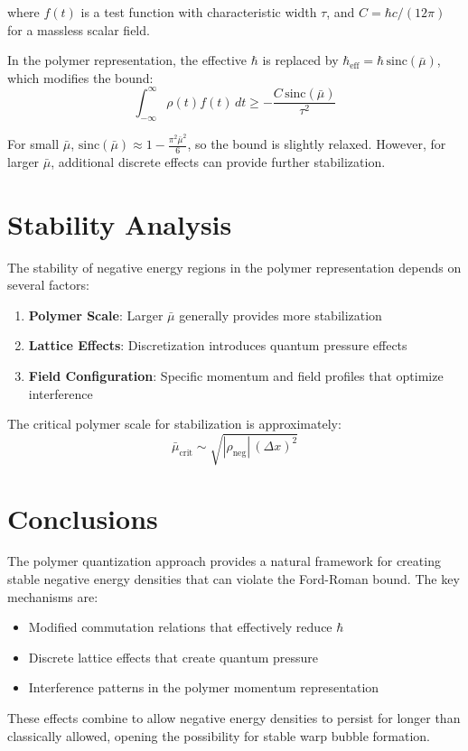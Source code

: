 \documentclass[12pt]{article}
\begin{document}
where $f(t)$ is a test function with characteristic width $\tau$, and $C = \hbar c/(12\pi)$ for a massless scalar field.

In the polymer representation, the effective $\hbar$ is replaced by $\hbar_{\text{eff}} = \hbar \, \text{sinc}(\bar{\mu})$, which modifies the bound:
\begin{equation}
\int_{-\infty}^{\infty} \rho(t) f(t) \, dt \geq -\frac{C \, \text{sinc}(\bar{\mu})}{\tau^2}
\end{equation}

For small $\bar{\mu}$, $\text{sinc}(\bar{\mu}) \approx 1 - \frac{\pi^2 \bar{\mu}^2}{6}$, so the bound is slightly relaxed. However, for larger $\bar{\mu}$, additional discrete effects can provide further stabilization.

\section{Stability Analysis}

The stability of negative energy regions in the polymer representation depends on several factors:

\begin{enumerate}
\item \textbf{Polymer Scale}: Larger $\bar{\mu}$ generally provides more stabilization
\item \textbf{Lattice Effects}: Discretization introduces quantum pressure effects
\item \textbf{Field Configuration}: Specific momentum and field profiles that optimize interference
\end{enumerate}

The critical polymer scale for stabilization is approximately:
\begin{equation}
\bar{\mu}_{\text{crit}} \sim \sqrt{|\rho_{\text{neg}}| \, (\Delta x)^2}
\end{equation}

\section{Conclusions}

The polymer quantization approach provides a natural framework for creating stable negative energy densities that can violate the Ford-Roman bound. The key mechanisms are:

\begin{itemize}
\item Modified commutation relations that effectively reduce $\hbar$
\item Discrete lattice effects that create quantum pressure
\item Interference patterns in the polymer momentum representation
\end{itemize}

These effects combine to allow negative energy densities to persist for longer than classically allowed, opening the possibility for stable warp bubble formation.
\end{document}
